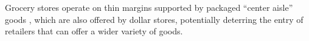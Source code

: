 \documentclass[12pt]{article}
\begin{document}
  
  







Grocery stores operate on thin margins supported by packaged ``center aisle'' goods  \citep{malinovskaya2026destination}, which are also offered by dollar stores, potentially deterring the entry of retailers that can offer a wider variety of goods. 
\end{document}
